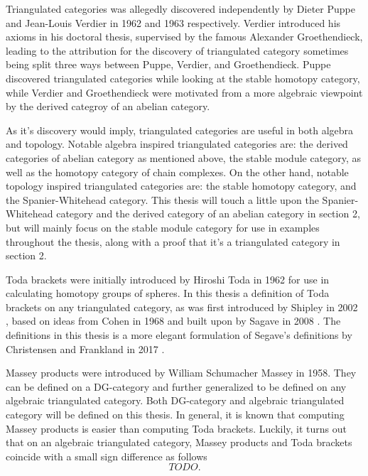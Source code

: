 Triangulated categories was allegedly discovered independently by Dieter Puppe and Jean-Louis Verdier in 1962 and 1963 respectively. Verdier introduced his axioms in his doctoral thesis, supervised by the famous Alexander Groethendieck, leading to the attribution for the discovery of triangulated category sometimes being split three ways between Puppe, Verdier, and Groethendieck. Puppe discovered triangulated categories while looking at the stable homotopy category, while Verdier and Groethendieck were motivated from a more algebraic viewpoint by the derived categroy of an abelian category.

As it's discovery would imply, triangulated categories are useful in both algebra and topology. Notable algebra inspired triangulated categories are: the derived categories of abelian category as mentioned above, the stable module category, as well as the homotopy category of chain complexes. On the other hand, notable topology inspired triangulated categories are: the stable homotopy category, and the Spanier-Whitehead category. This thesis will touch a little upon the Spanier-Whitehead category and the derived category of an abelian category in section 2, but will mainly focus on the stable module category for use in examples throughout the thesis, along with a proof that it's a triangulated category in section 2.

Toda brackets were initially introduced by Hiroshi Toda in 1962 for use in calculating homotopy groups of spheres. In this thesis a definition of Toda brackets on any triangulated category, as was first introduced by Shipley in 2002 \cite[Definition A.2]{Shipley_2002}, based on ideas from Cohen in 1968 \cite[Definition on bottom of p. 308]{Cohen_1968} and built upon by Sagave in 2008 \cite[Remark 4.5]{Sagave_2008}. The definitions in this thesis is a more elegant formulation of Segave's definitions by Christensen and Frankland in 2017 \cite[Definition 3.1]{Christensen-Frankland_2017}.

Massey products were introduced by William Schumacher Massey in 1958. They can be defined on a DG-category and further generalized to be defined on any algebraic triangulated category. Both DG-category and algebraic triangulated category will be defined on this thesis. In general, it is known that computing Massey products is easier than computing Toda brackets. Luckily, it turns out that on an algebraic triangulated category, Massey products and Toda brackets coincide with a small sign difference as follows
\[
    TODO.
\]

